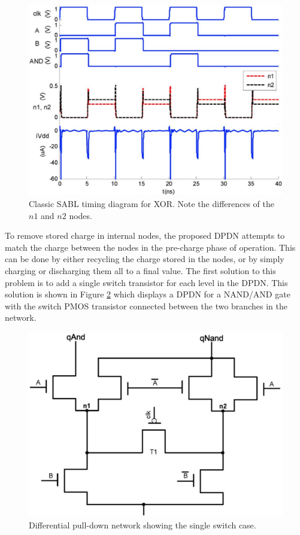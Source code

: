 \documentclass[conference, 12pt]{IEEEtran}
\newcommand{\x}{1}						%
\begin{document}
			\begin{figure}[tbp]
				\centering
				\includegraphics[width=\x\linewidth]{ReportFiles/SABL_XOR_Reference.png}
				\caption{Classic SABL timing diagram for XOR. Note the differences of the $n1$ and $n2$ nodes.\cite{b5}}
				\label{SABL_XOR_Reference}
			\end{figure}

			To remove stored charge in internal nodes, the proposed DPDN attempts to match the charge between the nodes in the pre-charge phase of operation. This can be done by either recycling the charge stored in the nodes, or by simply charging or discharging them all to a final value. The first solution to this problem is to add a single switch transistor for each level in the DPDN. This solution is shown in Figure \ref{DPDN_NAND_1Switch} which displays a DPDN for a NAND/AND gate with the switch PMOS transistor connected between the two branches in the network. 

			\begin{figure}[tbp]
				\centering
				\includegraphics[width=\x\linewidth]{ReportFiles/DPDN_NAND_1Switch.png}
				\caption{Differential pull-down network showing the single switch case.\cite{b5}}
				\label{DPDN_NAND_1Switch}
			\end{figure}
\end{document}
